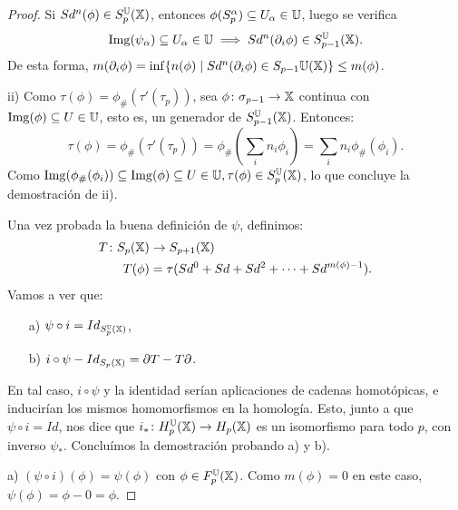 \begin{proof}
  Si $Sd^n(\phi) \in S_p^{\mathbb U}({\mathbb X})$, entonces $\phi(S_p^\alpha) \subseteq U_\alpha \in {\mathbb U}$, luego se verifica
  \[ \operatorname{Img}(\psi_\alpha) \subseteq U_\alpha \in {\mathbb U} \implies Sd^n(\partial_i \phi) \in S_{p-1}^{\mathbb U}({\mathbb X}). \]
  De esta forma, $m(\partial_i \phi) = \inf\{n(\phi) \mid Sd^n(\partial_i \phi) \in S_{p-1}{\mathbb U}({\mathbb X})\} \leq m(\phi)$.

  ii) Como $\tau(\phi) = \phi_\# (\tau'(\tau_p))$, sea $\phi \colon \sigma_{p-1} \to {\mathbb X}$ continua con $\operatorname{Img}(\phi) \subseteq U \in {\mathbb U}$, esto es,
  un generador de $S_{p-1}^{\mathbb U}({\mathbb X})$. Entonces:
  \[ \tau(\phi) = \phi_\#(\tau'(\tau_p)) = \phi_\#(\sum_i n_i \phi_i) = \sum_i n_i \phi_\#(\phi_i). \]
  Como $\operatorname{Img}(\phi_\#(\phi_i)) \subseteq \operatorname{Img}(\phi) \subseteq U \in {\mathbb U}, \tau(\phi) \in S_p^{\mathbb U}({\mathbb X})$, lo que concluye la demostración de ii).

  Una vez probada la buena definición de $\psi$, definimos:
  \begin{align*}
    T \colon S_p({\mathbb X}) &\to S_{p+1}({\mathbb X})  \\
    T(\phi) &= \tau(Sd^0 + Sd + Sd^2 + \dots + Sd^{m(\phi) - 1}).
  \end{align*}
  Vamos a ver que:
  \begin{itemize}
    \item[a)] $\psi \circ i = Id_{S_p^{\mathbb U}({\mathbb X})}$,
    \item[b)] $i \circ \psi - Id_{S_{p}({\mathbb X})} = \partial T - T \partial$.
  \end{itemize}
  En tal caso, $i \circ \psi$ y la identidad serían aplicaciones de cadenas homotópicas, e inducirían los mismos homomorfismos en la homología.
  Esto, junto a que $\psi \circ i = Id$, nos dice que $i_* \colon H_p^{{\mathbb U}}({\mathbb X}) \to H_p({\mathbb X})$ es un isomorfismo para todo $p$, con inverso $\psi_*$.
  Concluímos la demostración probando a) y b).

  a) $(\psi \circ i)(\phi) = \psi(\phi)$ con $\phi \in F_p^{\mathbb U}({\mathbb X})$. Como $m(\phi) = 0$ en este caso, $\psi(\phi) = \phi - 0 = \phi$.


\end{proof}
